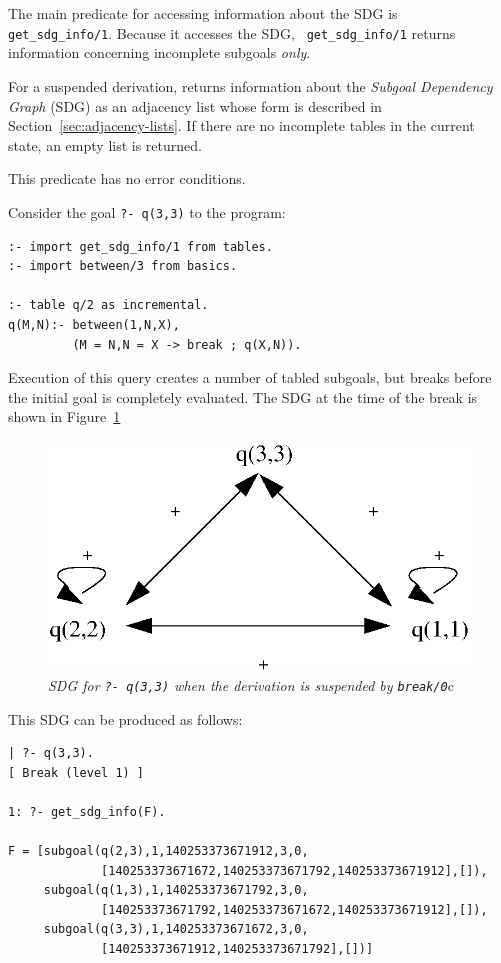 The main predicate for accessing information about the SDG is {\tt
  get\_sdg\_info/1}.  Because it accesses the SDG, {\tt
  get\_sdg\_info/1} returns information concerning incomplete subgoals
{\em only}.

\begin{description}
%
For a suspended derivation, returns information about the {\em
  Subgoal Dependency Graph} (SDG) as an adjacency list whose form is
described in Section~\ref{sec:adjacency-lists}.
%
If there are no incomplete tables in the current state, an empty list
is returned.

This predicate has no error conditions.

\begin{example} \rm \label{ex:get-sdg}
Consider the goal {\tt ?- q(3,3)} to the program:

\begin{verbatim}
:- import get_sdg_info/1 from tables.
:- import between/3 from basics.

:- table q/2 as incremental.
q(M,N):- between(1,N,X),
         (M = N,N = X -> break ; q(X,N)).
\end{verbatim}
Execution of this query creates a number of tabled subgoals, but
breaks before the initial goal is completely evaluated.  The SDG at
the time of the break is shown in Figure~\ref{fig:sdg-break-1}

\begin{figure}[htbp]
\centering
\includegraphics[width=.4\textwidth]{sdg-q-2}
\caption{{\em SDG for {\tt ?- q(3,3)} when the derivation is suspended by
  {\tt break/0}}c} \label{fig:sdg-break-1}
\end{figure}
%
This SDG can be produced as follows:
\begin{small}
\begin{verbatim}
| ?- q(3,3).
[ Break (level 1) ]

1: ?- get_sdg_info(F).

F = [subgoal(q(2,3),1,140253373671912,3,0,
             [140253373671672,140253373671792,140253373671912],[]),
     subgoal(q(1,3),1,140253373671792,3,0,
             [140253373671792,140253373671672,140253373671912],[]),
     subgoal(q(3,3),1,140253373671672,3,0,
             [140253373671912,140253373671792],[])]
\end{verbatim}
\end{small}

\end{example}

\end{description}

